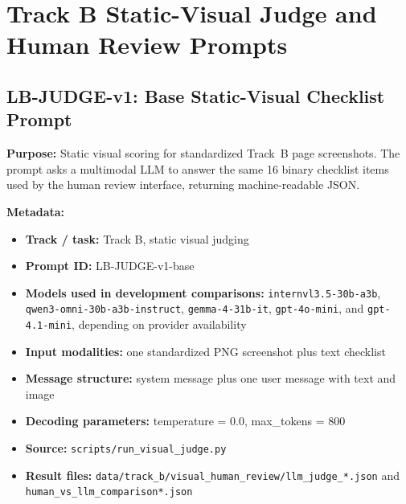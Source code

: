\section{Track B Static-Visual Judge and Human Review Prompts}
\label{app:track-b-visual-judge-prompts}

\subsection{LB-JUDGE-v1: Base Static-Visual Checklist Prompt}
\label{app:prompt-lb-judge-v1-base}

\textbf{Purpose:} Static visual scoring for standardized Track~B page
screenshots. The prompt asks a multimodal LLM to answer the same 16 binary
checklist items used by the human review interface, returning machine-readable
JSON.

\textbf{Metadata:}
\begin{itemize}
  \item \textbf{Track / task:} Track B, static visual judging
  \item \textbf{Prompt ID:} LB-JUDGE-v1-base
  \item \textbf{Models used in development comparisons:} \texttt{internvl3.5-30b-a3b},
  \texttt{qwen3-omni-30b-a3b-instruct}, \texttt{gemma-4-31b-it},
  \texttt{gpt-4o-mini}, and \texttt{gpt-4.1-mini}, depending on provider
  availability
  \item \textbf{Input modalities:} one standardized PNG screenshot plus text
  checklist
  \item \textbf{Message structure:} system message plus one user message with
  text and image
  \item \textbf{Decoding parameters:} temperature = 0.0, max\_tokens = 800
  \item \textbf{Source:} \texttt{scripts/run\_visual\_judge.py}
  \item \textbf{Result files:}
  \texttt{data/track\_b/visual\_human\_review/llm\_judge\_*.json} and
  \texttt{human\_vs\_llm\_comparison*.json}
\end{itemize}

